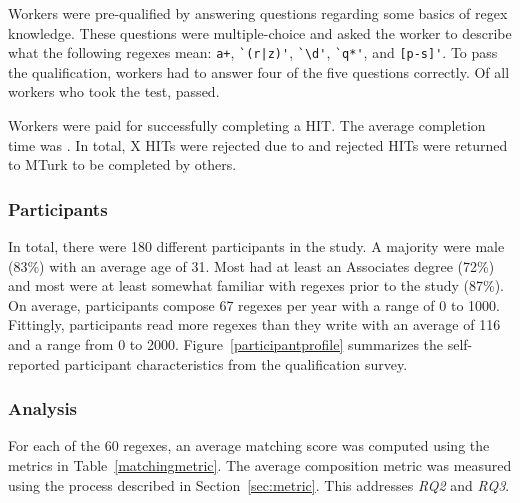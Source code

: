 Workers were pre-qualified by answering questions regarding some basics of regex knowledge. These questions were multiple-choice and asked the worker to describe what the following regexes mean: \verb!a+!, \verb!`(r|z)'!, \verb!`\d'!, \verb!`q*'!, and \verb![p-s]'!. To pass the qualification, workers had to answer four of the five questions correctly. Of all workers who took the test,  passed.

Workers were paid  for successfully completing a HIT.
The average completion time was .
In total, X HITs were rejected due to  and rejected HITs were returned to MTurk to be completed by others.







\subsubsection{Participants}

In total, there were 180 different participants in the study.
A majority were male (83\%) with an average age of 31. Most had
at least an Associates degree (72\%) and most were at least somewhat familiar with regexes prior to the study (87\%). On average,
participants compose 67 regexes per year with a range of 0 to 1000. Fittingly, participants read more regexes than they write with an average of 116 and a range from 0 to 2000. Figure~\ref{participantprofile} summarizes the self-reported participant characteristics from the qualification survey.

\subsubsection{Analysis}
For each of the 60 regexes, an average matching score was computed using the metrics in Table~\ref{matchingmetric}. The average composition metric was measured using the process described in Section~\ref{sec:metric}. This addresses \emph{RQ2} and \emph{RQ3}.



